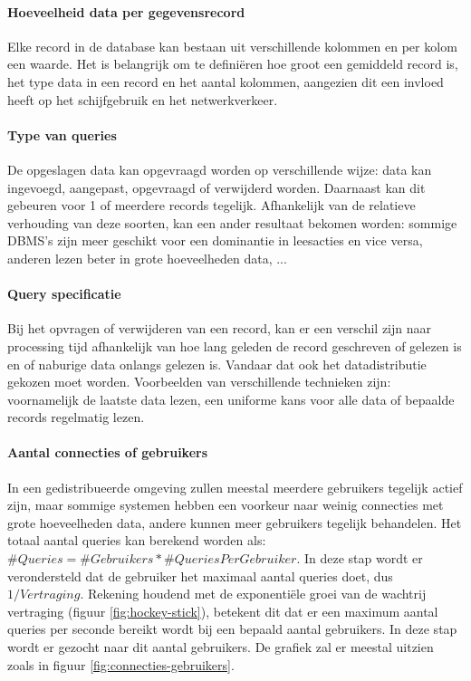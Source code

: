 \paragraph{Hoeveelheid data per gegevensrecord} Elke record in de database kan bestaan uit verschillende kolommen en per kolom een waarde. Het is belangrijk om te definiëren hoe groot een gemiddeld record is, het type data in een record en het aantal kolommen, aangezien dit een invloed heeft op het schijfgebruik en het netwerkverkeer.   

\paragraph{Type van queries} De opgeslagen data kan opgevraagd worden op verschillende wijze: data kan ingevoegd, aangepast, opgevraagd of verwijderd worden. Daarnaast kan dit gebeuren voor 1 of meerdere records tegelijk. Afhankelijk van de relatieve verhouding van deze soorten, kan een ander resultaat bekomen worden: sommige DBMS's zijn meer geschikt voor een dominantie in leesacties en vice versa, anderen lezen beter in grote hoeveelheden data, ...

\paragraph{Query specificatie} Bij het opvragen of verwijderen van een record, kan er een verschil zijn naar processing tijd afhankelijk van hoe lang geleden de record geschreven of gelezen is en of naburige data onlangs gelezen is. Vandaar dat ook het datadistributie gekozen moet worden. Voorbeelden van verschillende technieken zijn: voornamelijk de laatste data lezen, een uniforme kans voor alle data of bepaalde records regelmatig lezen.

\paragraph{Aantal connecties of gebruikers} In een gedistribueerde omgeving zullen meestal meerdere gebruikers tegelijk actief zijn, maar sommige systemen hebben een voorkeur naar weinig connecties met grote hoeveelheden data, andere kunnen meer gebruikers tegelijk behandelen. Het totaal aantal queries kan berekend worden als: $\#Queries = \#Gebruikers * \#QueriesPerGebruiker$. In deze stap wordt er verondersteld dat de gebruiker het maximaal aantal queries doet, dus $1/Vertraging$. Rekening houdend met de exponentiële groei van de wachtrij vertraging (figuur \ref{fig:hockey-stick}), betekent dit dat er een maximum aantal queries per seconde bereikt wordt bij een bepaald aantal gebruikers. In deze stap wordt er gezocht naar dit aantal gebruikers. De grafiek zal er meestal uitzien zoals in figuur \ref{fig:connecties-gebruikers}. 

